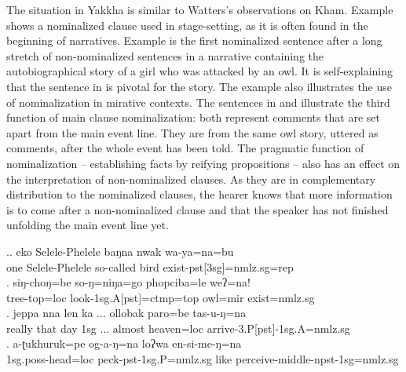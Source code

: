 The situation in Yakkha is  similar to Watters's observations on Kham. Example \Next[a] shows a nominalized clause used in stage-setting, as it is often found in the beginning of narratives. Example  \Next[b] is the first nominalized sentence after a long stretch of non-nominalized sentences in a narrative containing the autobiographical story of a girl who was attacked by an owl. It is self-explaining that the sentence in \Next[b] is pivotal for the story. The example also illustrates the use of nominalization in mirative contexts. The sentences in \Next[c] and \Next[d] illustrate the third function of main clause nominalization: both represent comments that are set apart from the main event line. They are from the same owl story, uttered as comments, after the whole event has been told. The  pragmatic function of nominalization –  establishing facts by reifying propositions – also has an effect on the interpretation of non-nominalized clauses.  As they are in complementary distribution to the nominalized clauses, the hearer knows that more information is to come after a non-nominalized clause and that the speaker has not finished unfolding the main event line yet.



\ex.\ag.  eko Selele-Phelele baŋna nwak wa-ya=na=bu\\
one Selele-Phelele so-called bird exist{\sc -pst[3sg]=nmlz.sg=rep}\\
 
\bg. siŋ-choŋ=be        so-ŋ=niŋa=go              phopciba=le          weʔ=na!\\
tree-top{\sc =loc} look{\sc -1sg.A[pst]=ctmp=top} owl{\sc =mir} exist{\sc [3sg.npst]=nmlz.sg}\\
 
\bg. jeppa nna  len ka ... ollobak paro=be tas-u-ŋ=na\\
really that day {\sc 1sg} ... almost heaven{\sc =loc} arrive{\sc -3.P[pst]-1sg.A=nmlz.sg}\\
 
\bg. a-ʈukhuruk=pe  og-a-ŋ=na loʔwa en-si-me-ŋ=na\\
{\sc 1sg.poss-}head{\sc =loc} peck{\sc -pst-1sg.P=nmlz.sg} like perceive{\sc -middle-npst-1sg=nmlz.sg}\\
 


